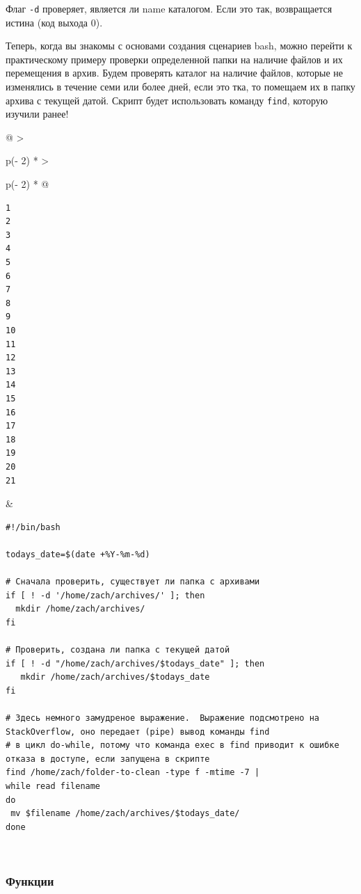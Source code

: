 \documentclass{article}
\begin{document}
Флаг \texttt{-d} проверяет, является ли name каталогом. Если это так,
возвращается истина (код выхода 0).

Теперь, когда вы знакомы с основами создания сценариев bash, можно
перейти к практическому примеру проверки определенной папки на наличие
файлов и их перемещения в архив. Будем проверять каталог на наличие
файлов, которые не изменялись в течение семи или более дней, если это
тка, то помещаем их в папку архива с текущей датой. Скрипт будет
использовать команду \texttt{find}, которую изучили ранее!

\begin{longtable}[]{@{}
  >{\raggedright\arraybackslash}p{(\columnwidth - 2\tabcolsep) * }
  >{\raggedright\arraybackslash}p{(\columnwidth - 2\tabcolsep) * }@{}}
\toprule
\endhead
\begin{minipage}[t]{\linewidth}\raggedright
\begin{verbatim}
1
2
3
4
5
6
7
8
9
10
11
12
13
14
15
16
17
18
19
20
21
\end{verbatim}
\end{minipage} & \begin{minipage}[t]{\linewidth}\raggedright
\begin{verbatim}
#!/bin/bash

todays_date=$(date +%Y-%m-%d)

# Сначала проверить, существует ли папка с архивами
if [ ! -d '/home/zach/archives/' ]; then
  mkdir /home/zach/archives/
fi

# Проверить, создана ли папка с текущей датой
if [ ! -d "/home/zach/archives/$todays_date" ]; then
   mkdir /home/zach/archives/$todays_date
fi

# Здесь немного замудреное выражение.  Выражение подсмотрено на StackOverflow, оно передает (pipe) вывод команды find
# в цикл do-while, потому что команда exec в find приводит к ошибке отказа в доступе, если запущена в скрипте
find /home/zach/folder-to-clean -type f -mtime -7 |
while read filename
do
 mv $filename /home/zach/archives/$todays_date/
done
\end{verbatim}
\end{minipage} \\ \addlinespace
\bottomrule
\end{longtable}

\hypertarget{Functions}{%
\subsubsection{\texorpdfstring{\protect\hyperlink{Functions}{}Функции}{Функции}}\label{Functions}}
\end{document}

